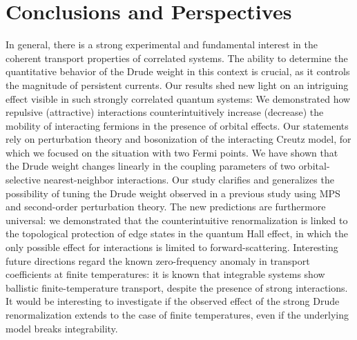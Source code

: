 \chapter{Conclusions and Perspectives}
In general, there is a strong experimental and fundamental interest in the coherent transport properties of correlated systems.
The ability to determine the quantitative behavior of the Drude weight in this context is crucial, as it controls the magnitude of persistent currents.
Our results shed new light on an intriguing effect visible in such strongly correlated quantum systems: We demonstrated how repulsive (attractive) interactions counterintuitively increase (decrease) the mobility of interacting fermions in the presence of orbital effects.
Our statements rely on perturbation theory and bosonization of the interacting Creutz model, for which we focused on the situation with two Fermi points.
We have shown that the Drude weight changes linearly in the coupling parameters of two orbital- selective nearest-neighbor interactions.
Our study clarifies and generalizes the possibility of tuning the Drude weight observed in a previous study using MPS and second-order perturbation theory.
The new predictions are furthermore universal: we demonstrated that the counterintuitive renormalization is linked to the topological protection of edge states in the quantum Hall effect, in which the only possible effect for interactions is limited to forward-scattering.
Interesting future directions regard the known zero-frequency anomaly in transport coefficients at finite temperatures: it is known that integrable systems show ballistic finite-temperature transport, despite the presence of strong interactions.
It would be interesting to investigate if the observed effect of the strong Drude renormalization extends to the case of finite temperatures, even if the underlying model breaks integrability.

